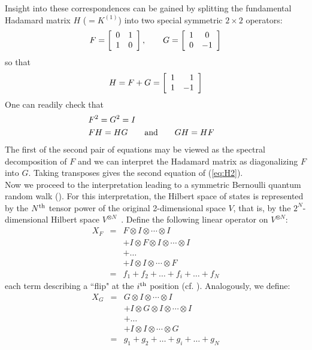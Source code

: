 \documentclass[12pt]{article}
\numberwithin{equation}{section}
\begin{document}
Insight  into these correspondences can be gained by splitting 
the fundamental Ha\-da\-mard matrix $H$ ($=K^{(1)}$) into two special symmetric $2\times2$ operators:
$$ 
         F=\left[\begin{array}{cc}0&1\cr 1&0\cr\end{array}\right],    \qquad
         G=\left[\begin{array}{cc}1&0\cr \hfill 0&-1\cr\end{array}\right]
$$
so that 
$$
H=F+G = \left[\begin{array}{cc} 1 & \hfill 1 \cr
                       1 & -1 \cr\end{array}\right]
$$
One can readily check that 
%
\begin{eqnarray}
       & F^2=G^2=I & \nonumber\\ \label{eq:H2}
       & FH =HG    \qquad\hbox{and}\qquad GH=HF&
\end{eqnarray}
%
The first of the second pair of equations may be viewed as 
the spectral decomposition of $F$ and we can interpret the Hadamard
matrix as diagonalizing $F$ into $G$. Taking transposes gives the second equation of
(\ref{eq:H2}).\\

Now we proceed to the interpretation leading to a symmetric Bernoulli quantum random walk (\cite{FK}).
For this interpretation, the Hilbert space of states is represented 
by the $N^{\rm th}$ tensor power of the original 2-dimensional space $V$,
that is, by the $2^N$-dimensional Hilbert space $V^{\otimes N}$\ .
Define the following linear operator on $V^{\otimes N}$:
%
\begin{eqnarray*}
X_F &=& F\otimes I \otimes\cdots\otimes I          \\
     &&+ I\otimes F\otimes I \otimes\cdots\otimes I \\
     && +\ldots                                    \\
     && +I\otimes I \otimes\cdots\otimes F \\
    &=& f_1+f_2+\ldots+f_i+\ldots+f_N
\end{eqnarray*}
%
each term describing a ``flip" at the $i^{\rm th}$ position (cf. \cite{H,Si}).
Analogously, we define:
%
\begin{eqnarray*}
X_G &=& G\otimes I \otimes\cdots\otimes I\\
    & & +I\otimes G\otimes I \otimes\cdots\otimes I\\
    & & +\ldots \\
    & & +I\otimes I \otimes\cdots\otimes G \\
    &=& g_1+g_2+\ldots+g_i+\ldots+g_N
\end{eqnarray*}
%
\end{document}
